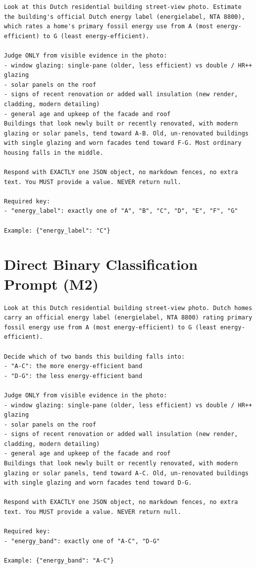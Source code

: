 \begin{lstlisting}[keywords={},mathescape=false,basicstyle=\ttfamily\footnotesize,breaklines=true]
Look at this Dutch residential building street-view photo. Estimate the building's official Dutch energy label (energielabel, NTA 8800), which rates a home's primary fossil energy use from A (most energy-efficient) to G (least energy-efficient).

Judge ONLY from visible evidence in the photo:
- window glazing: single-pane (older, less efficient) vs double / HR++ glazing
- solar panels on the roof
- signs of recent renovation or added wall insulation (new render, cladding, modern detailing)
- general age and upkeep of the facade and roof
Buildings that look newly built or recently renovated, with modern glazing or solar panels, tend toward A-B. Old, un-renovated buildings with single glazing and worn facades tend toward F-G. Most ordinary housing falls in the middle.

Respond with EXACTLY one JSON object, no markdown fences, no extra text. You MUST provide a value. NEVER return null.

Required key:
- "energy_label": exactly one of "A", "B", "C", "D", "E", "F", "G"

Example: {"energy_label": "C"}
\end{lstlisting}

\section{Direct Binary Classification Prompt (M2)}
\label{sec:appendix_c_binary_prompt}

\begin{lstlisting}[keywords={},mathescape=false,basicstyle=\ttfamily\footnotesize,breaklines=true]
Look at this Dutch residential building street-view photo. Dutch homes carry an official energy label (energielabel, NTA 8800) rating primary fossil energy use from A (most energy-efficient) to G (least energy-efficient).

Decide which of two bands this building falls into:
- "A-C": the more energy-efficient band
- "D-G": the less energy-efficient band

Judge ONLY from visible evidence in the photo:
- window glazing: single-pane (older, less efficient) vs double / HR++ glazing
- solar panels on the roof
- signs of recent renovation or added wall insulation (new render, cladding, modern detailing)
- general age and upkeep of the facade and roof
Buildings that look newly built or recently renovated, with modern glazing or solar panels, tend toward A-C. Old, un-renovated buildings with single glazing and worn facades tend toward D-G.

Respond with EXACTLY one JSON object, no markdown fences, no extra text. You MUST provide a value. NEVER return null.

Required key:
- "energy_band": exactly one of "A-C", "D-G"

Example: {"energy_band": "A-C"}
\end{lstlisting}

